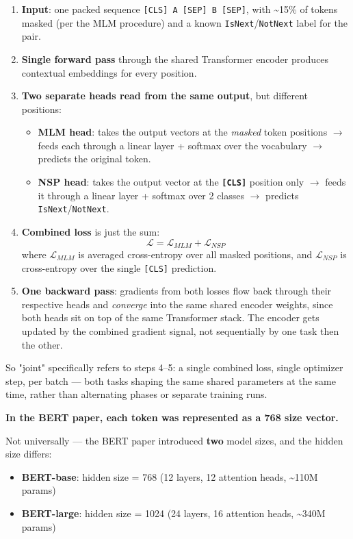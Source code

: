 \begin{enumerate}
\item \textbf{Input}: one packed sequence \texttt{[CLS] A [SEP] B [SEP]}, with \textasciitilde{}15\% of tokens masked (per the MLM procedure) and a known \texttt{IsNext}/\texttt{NotNext} label for the pair.
\item \textbf{Single forward pass} through the shared Transformer encoder produces contextual embeddings for every position.
\item \textbf{Two separate heads read from the same output}, but different positions:
\begin{itemize}
\item \textbf{MLM head}: takes the output vectors at the \textit{masked} token positions $\to$ feeds each through a linear layer + softmax over the vocabulary $\to$ predicts the original token.
\item \textbf{NSP head}: takes the output vector at the \textbf{\texttt{[CLS]}} position only $\to$ feeds it through a linear layer + softmax over 2 classes $\to$ predicts \texttt{IsNext}/\texttt{NotNext}.
\end{itemize}
\item \textbf{Combined loss} is just the sum:
\[
\mathcal{L} = \mathcal{L}_{MLM} + \mathcal{L}_{NSP}
\]
where $\mathcal{L}_{MLM}$ is averaged cross-entropy over all masked positions, and $\mathcal{L}_{NSP}$ is cross-entropy over the single \texttt{[CLS]} prediction.
\item \textbf{One backward pass}: gradients from both losses flow back through their respective heads and \textit{converge} into the same shared encoder weights, since both heads sit on top of the same Transformer stack. The encoder gets updated by the combined gradient signal, not sequentially by one task then the other.
\end{enumerate}

So "joint" specifically refers to steps 4--5: a single combined loss, single optimizer step, per batch --- both tasks shaping the same shared parameters at the same time, rather than alternating phases or separate training runs.

\textbf{In the BERT paper, each token was represented as a 768 size vector.}

Not universally --- the BERT paper introduced \textbf{two} model sizes, and the hidden size differs:

\begin{itemize}
\item \textbf{BERT-base}: hidden size = 768 (12 layers, 12 attention heads, \textasciitilde{}110M params)
\item \textbf{BERT-large}: hidden size = 1024 (24 layers, 16 attention heads, \textasciitilde{}340M params)
\end{itemize}

